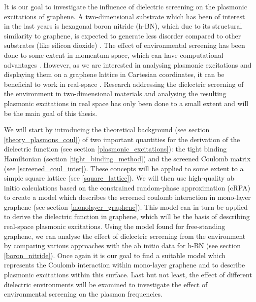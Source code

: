 
It is our goal to investigate the influence of dielectric screening on the plasmonic excitations of graphene. A two-dimensional substrate which has been of interest in the last years is hexagonal boron nitride (h-BN), which due to its structural similarity to graphene, is expected to generate less disorder compared to other substrates (like silicon dioxide) \cite{Sarma2011}. The effect of environmental screening has been done to some extent in momentum-space, which can have computational advantages \cite{Roesner2015,Hwang2007}. However, as we are interested in analysing plasmonic excitations and displaying them on a graphene lattice in Cartesian coordinates, it can be beneficial to work in real-space \cite{Westerhout2018,Westerhout2021}. Research addressing the dielectric screening of the environment in two-dimensional materials and analysing the resulting plasmonic excitations in real space has only been done to a small extent \cite{Westerhout2021,Wang2015} and will be the main goal of this thesis. \medskip


We will start by introducing the theoretical background (see section \ref{theory_plasmons_coul}) of two important quantities for the derivation of the dielectric function (see section \ref{plasmonic_excitations}): the tight binding Hamiltonian (section \ref{tight_binding_method}) and the screened Coulomb matrix (see \ref{screened_coul_inter}). These concepts will be applied to some extent to a simple square lattice (see \ref{square_lattice}). We will then use high-quality ab initio calculations based on the constrained random-phase approximation (cRPA) to create a model which describes the screened coulomb interaction in mono-layer graphene (see section \ref{monolayer_graphene}). This model can in turn be applied to derive the dielectric function in graphene, which will be the basis of describing real-space plasmonic excitations. Using the model found for free-standing graphene, we can analyse the effect of dielectric screening from the environment by comparing various approaches with the ab initio data for h-BN (see section \ref{boron_nitride}). Once again it is our goal to find a suitable model which represents the Coulomb interaction within mono-layer graphene and to describe plasmonic excitations within this surface. Last but not least, the effect of different dielectric environments will be examined to investigate the effect of environmental screening on the plasmon frequencies.

